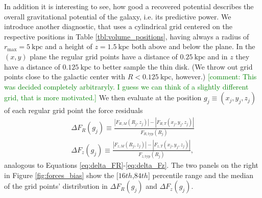 \documentclass[iop,revtex4,numberedappendix,appendixfloats]{emulateapj}
\newcommand{\HW}[1]{\textcolor{Green}{#1}}
\begin{document}
In addition it is interesting to see, how good a recovered potential describes the overall gravitational potential of the galaxy, i.e. its predictive power. We introduce another diagnostic, that uses a cylindrical grid centered on the respective positions in Table \ref{tbl:volume_positions}, having always a radius of $r_\text{max}=5~\text{kpc}$ and a height of $z=1.5~\text{kpc}$ both above and below the plane.  In the $(x,y)$ plane the regular grid points have a distance of $0.25~\text{kpc}$ and in $z$ they have a distance of  $0.125~\text{kpc}$ to better sample the thin disk. (We throw out grid points close to the galactic center with $R<0.125~\text{kpc}$, however.) \HW{[comment: This was decided completely arbitraryly. I guess we can think of a slightly different grid, that is more motivated.]} We then evaluate at the position $g_j \equiv (x_j,y_j,z_j)$ of each regular grid point the force residuals
\begin{eqnarray}
\Delta F_R(g_j) \equiv \frac{|F_{R,M}(R_j,z_j)| - |F_{R,T}(x_j,y_j,z_j)|}{F_{R,\text{typ}}(R_j)} \label{eq:delta_FR_grid}\\
\Delta F_z(g_j) \equiv \frac{|F_{z,M}(R_j,z_j)| - |F_{z,T}(x_j,y_j,z_j)|}{F_{z,\text{typ}}(R_j)},\label{eq:delta_Fz_grid}
\end{eqnarray}
analogous to Equations \eqref{eq:delta_FR}-\eqref{eq:delta_Fz}. The two panels on the right in Figure \ref{fig:forces_bias} show the [$16th$,$84th$] percentile range and the median of the grid points' distribution in $\Delta F_R(g_j)$ and $\Delta F_z(g_j)$.
\end{document}
